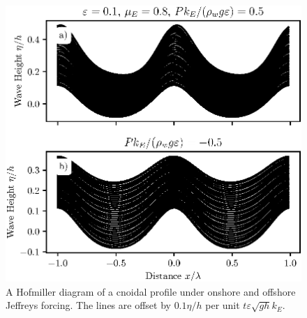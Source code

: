 \documentclass{jfm}
\renewcommand*{\epsilon}{\varepsilon}
\begin{document}
\begin{figure}
  \centering
  \includegraphics{Hofmiller-Cnoidal.eps}
  \caption{
    A Hofmiller diagram of a cnoidal profile under onshore and offshore
    Jeffreys forcing.
    The lines are offset by $0.1 \eta/h$ per unit $t \epsilon \sqrt{g h}
    k_E$.
  }
\end{figure}
\end{document}

